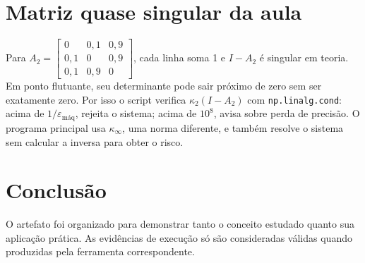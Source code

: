 \documentclass[12pt]{article}
\begin{document}
\section*{Matriz quase singular da aula}
Para $A_2=\left[\begin{smallmatrix}0&0,1&0,9\\0,1&0&0,9\\0,1&0,9&0\end{smallmatrix}\right]$, cada linha soma 1 e $I-A_2$ é singular em teoria. Em ponto flutuante, seu determinante pode sair próximo de zero sem ser exatamente zero. Por isso o script verifica $\kappa_2(I-A_2)$ com \texttt{np.linalg.cond}: acima de $1/\varepsilon_{\mathrm{máq}}$, rejeita o sistema; acima de $10^8$, avisa sobre perda de precisão. O programa principal usa $\kappa_\infty$, uma norma diferente, e também resolve o sistema sem calcular a inversa para obter o risco.
\section*{Conclusão}
O artefato foi organizado para demonstrar tanto o conceito estudado quanto sua aplicação prática. As evidências de execução só são consideradas válidas quando produzidas pela ferramenta correspondente.
\end{document}
